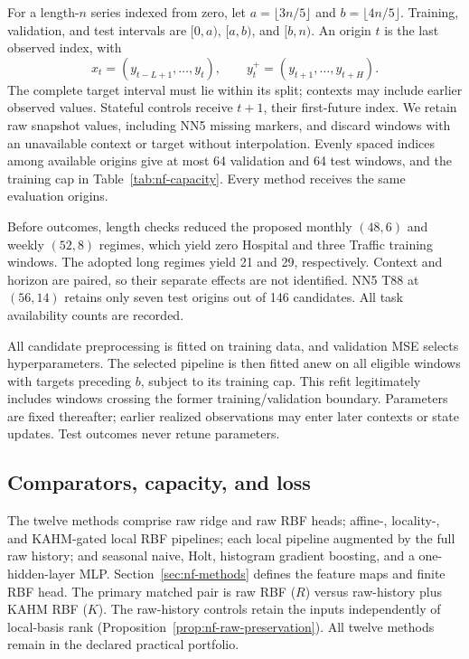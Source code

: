 For a length-$n$ series indexed from zero, let
$a=\lfloor3n/5\rfloor$ and $b=\lfloor4n/5\rfloor$.  Training, validation, and
test intervals are $[0,a)$, $[a,b)$, and $[b,n)$.  An origin $t$ is the last
observed index, with
\begin{equation}
 x_t=(y_{t-L+1},\ldots,y_t),\qquad
 y_t^+=(y_{t+1},\ldots,y_{t+H}).
 \label{eq:nf-forecast-window}
\end{equation}
The complete target interval must lie within its split; contexts may include
earlier observed values.  Stateful controls receive $t+1$, their first-future
index.  We retain raw snapshot values, including NN5 missing markers, and
discard windows with an unavailable context or target without interpolation.
Evenly spaced indices among available origins give at most 64 validation and
64 test windows, and the training cap in Table~\ref{tab:nf-capacity}.  Every
method receives the same evaluation origins.

Before outcomes, length checks reduced the proposed monthly $(48,6)$ and
weekly $(52,8)$ regimes, which yield zero Hospital and three Traffic training
windows.  The adopted long regimes yield 21 and 29, respectively.  Context
and horizon are paired, so their separate effects are not identified.
NN5 T88 at $(56,14)$ retains only seven test origins out of 146 candidates.
All task availability counts are recorded.

All candidate preprocessing is fitted on training data, and validation MSE
selects hyperparameters.  The selected pipeline is then fitted anew on all
eligible windows with targets preceding $b$, subject to its training cap.
This refit legitimately includes windows crossing the former training/validation
boundary.  Parameters are fixed thereafter; earlier realized observations may
enter later contexts or state updates.  Test outcomes never retune parameters.

\subsection{Comparators, capacity, and loss}
\label{sec:nf-comparators}

The twelve methods comprise raw ridge and raw RBF heads; affine-, locality-,
and KAHM-gated local RBF pipelines; each local pipeline augmented by the full
raw history; and seasonal naive, Holt, histogram gradient boosting, and a
one-hidden-layer MLP.  Section~\ref{sec:nf-methods} defines the feature maps and
finite RBF head.  The primary matched pair is raw RBF ($R$) versus raw-history
plus KAHM RBF ($K$).  The raw-history controls retain the inputs independently
of local-basis rank (Proposition~\ref{prop:nf-raw-preservation}).  All twelve
methods remain in the declared practical portfolio.

